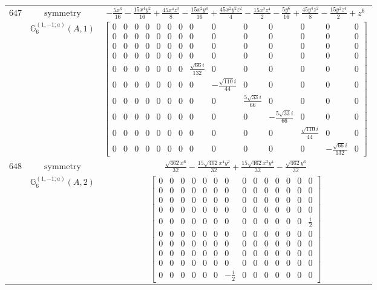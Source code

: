 \documentclass[fleqn,8pt,landscape]{jsarticle}
\begin{document}
\begin{longtable}{ccc}
$ 647 $ & $ \text{symmetry} $ & $ - \frac{5 x^{6}}{16} - \frac{15 x^{4} y^{2}}{16} + \frac{45 x^{4} z^{2}}{8} - \frac{15 x^{2} y^{4}}{16} + \frac{45 x^{2} y^{2} z^{2}}{4} - \frac{15 x^{2} z^{4}}{2} - \frac{5 y^{6}}{16} + \frac{45 y^{4} z^{2}}{8} - \frac{15 y^{2} z^{4}}{2} + z^{6} $ \\
$  $ & $ \mathbb{G}_{6}^{(1,-1;a)}(A,1) $ & $ \begin{bmatrix} 0 & 0 & 0 & 0 & 0 & 0 & 0 & 0 & 0 & 0 & 0 & 0 & 0 & 0 \\ 0 & 0 & 0 & 0 & 0 & 0 & 0 & 0 & 0 & 0 & 0 & 0 & 0 & 0 \\ 0 & 0 & 0 & 0 & 0 & 0 & 0 & 0 & 0 & 0 & 0 & 0 & 0 & 0 \\ 0 & 0 & 0 & 0 & 0 & 0 & 0 & 0 & 0 & 0 & 0 & 0 & 0 & 0 \\ 0 & 0 & 0 & 0 & 0 & 0 & 0 & \frac{\sqrt{66} i}{132} & 0 & 0 & 0 & 0 & 0 & 0 \\ 0 & 0 & 0 & 0 & 0 & 0 & 0 & 0 & - \frac{\sqrt{110} i}{44} & 0 & 0 & 0 & 0 & 0 \\ 0 & 0 & 0 & 0 & 0 & 0 & 0 & 0 & 0 & \frac{5 \sqrt{33} i}{66} & 0 & 0 & 0 & 0 \\ 0 & 0 & 0 & 0 & 0 & 0 & 0 & 0 & 0 & 0 & - \frac{5 \sqrt{33} i}{66} & 0 & 0 & 0 \\ 0 & 0 & 0 & 0 & 0 & 0 & 0 & 0 & 0 & 0 & 0 & \frac{\sqrt{110} i}{44} & 0 & 0 \\ 0 & 0 & 0 & 0 & 0 & 0 & 0 & 0 & 0 & 0 & 0 & 0 & - \frac{\sqrt{66} i}{132} & 0 \end{bmatrix} $ \\ \hline
$ 648 $ & $ \text{symmetry} $ & $ \frac{\sqrt{462} x^{6}}{32} - \frac{15 \sqrt{462} x^{4} y^{2}}{32} + \frac{15 \sqrt{462} x^{2} y^{4}}{32} - \frac{\sqrt{462} y^{6}}{32} $ \\
$  $ & $ \mathbb{G}_{6}^{(1,-1;a)}(A,2) $ & $ \begin{bmatrix} 0 & 0 & 0 & 0 & 0 & 0 & 0 & 0 & 0 & 0 & 0 & 0 & 0 & 0 \\ 0 & 0 & 0 & 0 & 0 & 0 & 0 & 0 & 0 & 0 & 0 & 0 & 0 & 0 \\ 0 & 0 & 0 & 0 & 0 & 0 & 0 & 0 & 0 & 0 & 0 & 0 & 0 & 0 \\ 0 & 0 & 0 & 0 & 0 & 0 & 0 & 0 & 0 & 0 & 0 & 0 & 0 & 0 \\ 0 & 0 & 0 & 0 & 0 & 0 & 0 & 0 & 0 & 0 & 0 & 0 & 0 & \frac{i}{2} \\ 0 & 0 & 0 & 0 & 0 & 0 & 0 & 0 & 0 & 0 & 0 & 0 & 0 & 0 \\ 0 & 0 & 0 & 0 & 0 & 0 & 0 & 0 & 0 & 0 & 0 & 0 & 0 & 0 \\ 0 & 0 & 0 & 0 & 0 & 0 & 0 & 0 & 0 & 0 & 0 & 0 & 0 & 0 \\ 0 & 0 & 0 & 0 & 0 & 0 & 0 & 0 & 0 & 0 & 0 & 0 & 0 & 0 \\ 0 & 0 & 0 & 0 & 0 & 0 & - \frac{i}{2} & 0 & 0 & 0 & 0 & 0 & 0 & 0 \end{bmatrix} $ \\ \hline

\end{longtable}
\end{document}
